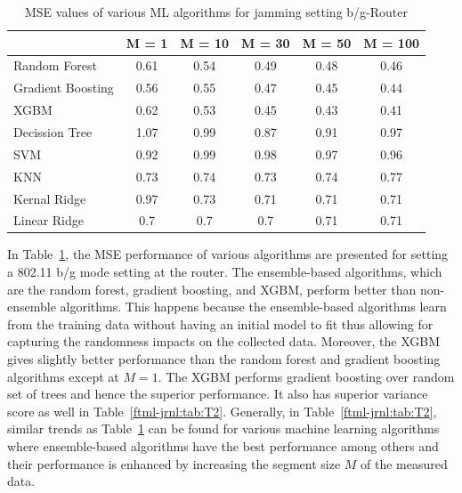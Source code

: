 \begin{table}[!ht]
	\centering
	\caption{MSE values of various ML algorithms for jamming setting b/g-Router}
	\begin{tabular}{|p{5.3em}|c|c|c|c|c|}
		\toprule
		& \multicolumn{1}{p{2.4em}|}{M = 1} & \multicolumn{1}{p{2.9em}|}{M = 10} & \multicolumn{1}{p{2.9em}|}{M = 30} & \multicolumn{1}{p{2.9em}|}{M = 50} & \multicolumn{1}{p{3.4em}|}{M = 100} \\
		\midrule
		Random Forest	 & 0.61  & 0.54  & 0.49  & 0.48  & 0.46 \\
		\midrule
		Gradient Boosting  & 0.56  & 0.55  & 0.47  & 0.45  & 0.44 \\
		\midrule
		XGBM  & 0.62  & 0.53  & 0.45  & 0.43  & 0.41 \\
		\midrule
		Decission Tree & 1.07  & 0.99  & 0.87  & 0.91  & 0.97 \\
		\midrule
		SVM   & 0.92  & 0.99  & 0.98  & 0.97  & 0.96 \\
		\midrule
		KNN   & 0.73  & 0.74  & 0.73  & 0.74  & 0.77 \\
		\midrule
		Kernal Ridge & 0.97  & 0.73  & 0.71  & 0.71  & 0.71 \\
		\midrule
		Linear Ridge & 0.7   & 0.7   & 0.7   & 0.71  & 0.71 \\
		\bottomrule
	\end{tabular}%
	\label{ftml-jrnl:tab:T1}%
\end{table}%

In Table~\ref{ftml-jrnl:tab:T1}, the MSE performance of various algorithms are presented for setting a 802.11 b/g mode setting at the router. The ensemble-based algorithms, which are the random forest, gradient boosting, and XGBM, perform better than non-ensemble algorithms. This happens because the ensemble-based algorithms learn from the training data without having an initial model to fit thus allowing for capturing the randomness impacts on the collected data. Moreover, the XGBM gives slightly better performance than the random forest and gradient boosting algorithms except at $M=1$. The XGBM performs gradient boosting over random set of trees and hence the superior performance. It also has superior variance score as well in Table~\ref{ftml-jrnl:tab:T2}. Generally, in Table~\ref{ftml-jrnl:tab:T2}, similar trends as Table~\ref{ftml-jrnl:tab:T1} can be found for various machine learning algorithms where ensemble-based algorithms have the best performance among others and their performance is enhanced by increasing the segment size $M$ of the measured data.

